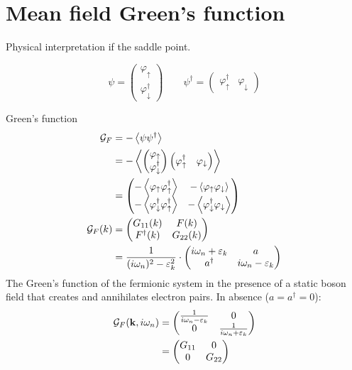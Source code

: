\section{Mean field Green's function}
Physical interpretation if the saddle point. 

\begin{equation}
\psi = 
\begin{pmatrix}
\varphi_{\uparrow} \\
\varphi_\downarrow^\dagger
\end{pmatrix}\qquad 
\psi^\dagger = 
\begin{pmatrix}
\varphi_{\uparrow}^\dagger &
\varphi_\downarrow
\end{pmatrix}
\end{equation}

Green's function 
\begin{align*}
\mathcal{G}_F &= -\ev{\psi\psi^\dagger} \\
&= -\ev{\begin{pmatrix}
	\varphi_{\uparrow} \\
	\varphi_\downarrow^\dagger
	\end{pmatrix}
	\begin{pmatrix}
	\varphi_{\uparrow}^\dagger &
	\varphi_\downarrow
	\end{pmatrix}}\\
&= 
\begin{pmatrix}
-\ev{\varphi_\uparrow\varphi_\uparrow^\dagger} & -\ev{\varphi_\uparrow\varphi_\downarrow} \\
-\ev{\varphi_\downarrow^\dagger\varphi_\uparrow^\dagger} & -\ev{\varphi_\downarrow^\dagger\varphi_\downarrow}
\end{pmatrix} \\
\mathcal{G}_F(k) &= 
\begin{pmatrix}
G_{11}(k) & F(k) \\
F^\dagger(k)& G_{22}(k)
\end{pmatrix} \\
&= \frac{1}{(i\omega_n)^2-\varepsilon_k^2}\cdot\begin{pmatrix}
i\omega_n + \varepsilon_k & a \\
a^\dagger & i\omega_n - \varepsilon_k
\end{pmatrix}
\end{align*}
The Green's function of the fermionic system in the presence of a static boson field that creates and annihilates electron pairs. 
In absence ($a = a^\dagger = 0$):
\begin{align}
\mathcal{G}_F(\vb{k}, i\omega_n) &= 
	\begin{pmatrix}
	\frac{1}{i\omega_n - \varepsilon_k}  & 0 \\
	0 & \frac{1}{i\omega_n + \varepsilon_k} 
	\end{pmatrix}
	\\
	&=
	\begin{pmatrix}
	G_{11} & 0\\
	0 & G_{22}
	\end{pmatrix}
\end{align}
